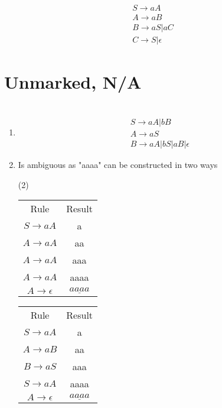 \documentclass{article} %
\begin{document}
    \section{}
            \begin{gather*}
                S \to aA\\
                A \to aB\\
                B \to aS | aC\\
                C \to S | \epsilon
            \end{gather*}
    \section{Unmarked, N/A}
    \section{}
        \begin{enumerate}

            \item
            \begin{gather*}
                S \to aA | bB\\
                A \to aS\\
                B \to aA | bS | aB | \epsilon
            \end{gather*}
            \item Is ambiguous as "aaaa" can be constructed in two ways
            \begin{center}
                \begin{varwidth}{\textwidth}
                \begin{tasks}[label={(\Roman*)},label-width={1cm}](2)
                    \task
                    \begin{tabular}{ c c}
                        Rule & Result\\
                        $S \to aA$ & a\\
                        $A \to aA$ & aa\\
                        $A \to aA$ & aaa\\
                        $A \to aA$ & aaaa\\
                        $A \to \epsilon$ & $\underline{aaaa}$
                    \end{tabular}

                    \task
                    \begin{tabular}{ c c}
                        Rule & Result\\
                        $S \to aA$ & a\\
                        $A \to aB$ & aa\\
                        $B \to aS$ & aaa\\
                        $S \to aA$ & aaaa\\
                        $A \to \epsilon$ & $\underline{aaaa}$
                    \end{tabular}
                \end{tasks}
                \end{varwidth}
            \end{center}
        \end{enumerate}
\end{document}
